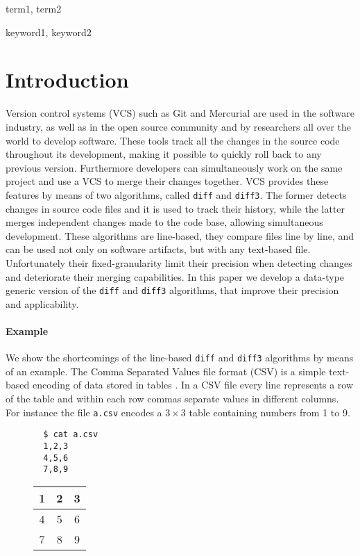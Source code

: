 \documentclass[preprint]{sigplanconf}
\theoremstyle{plain}
\begin{document}

\terms
term1, term2

\keywords
keyword1, keyword2

\section{Introduction}
Version control systems (VCS) such as Git \cite{Git} and Mercurial \cite{Mercurial}
are used in the software industry, as well as in the open source community and by researchers all over the world to develop software.
These tools track all the changes in the source code throughout its development, making it possible to quickly roll back to any previous version. Furthermore developers can simultaneously work on the same project and use a VCS to merge their changes together.
VCS provides these features by means of two algorithms, called \texttt{diff} and \texttt{diff3}.
The former detects changes in source code files and it is used to track their history, while the latter merges independent changes made to the code base, allowing simultaneous development.
These algorithms are line-based, they compare files line by line, and can be used not only on software artifacts, but with any text-based file. 
Unfortunately their fixed-granularity limit their precision when detecting changes and deteriorate their merging capabilities. In this paper we develop a data-type generic version of the \texttt{diff} and \texttt{diff3} algorithms, that improve their precision and applicability.

\paragraph{Example}
We show the shortcomings of the line-based \texttt{diff} and \texttt{diff3} algorithms by means of an example.
The Comma Separated Values file format (CSV) is a simple text-based encoding of data stored in tables \cite{csv}.
In a CSV file every line represents a row of the table and within each row commas separate values in different columns.
For instance the file \texttt{a.csv} encodes a $3 \times 3$ table containing numbers from 1 to 9.
\begin{figure}[!h]
\centering
\begin{minipage}{.15\textwidth}
{  \centering
  \begin{verbatim}
  $ cat a.csv
  1,2,3
  4,5,6
  7,8,9
  \end{verbatim}\par
}
\end{minipage}%
\begin{minipage}{.15\textwidth}
{  \centering
  \begin{tabular}{ | c | c | c | }
    \hline
    1 & 2 & 3 \\ \hline
    4 & 5 & 6 \\ \hline
    7 & 8 & 9  \\ \hline
  \end{tabular}\par
}
\end{minipage}%
\end{figure}
\end{document}

